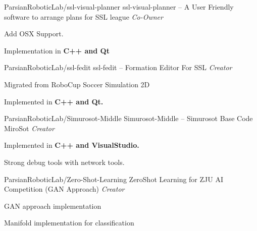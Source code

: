 
\begin{cventries}
  \cventry
    {ParsianRoboticLab/ssl-visual-planner} %
    {ssl-visual-planner -- A User Friendly software to arrange plans for SSL league} %
    {\textit{Co-Owner}} %
    {} %
    {
      \begin{cvitems} %
        \item {Add OSX Support.}
        \item {Implementation in \textbf{C++ and Qt}}
      \end{cvitems}
    }
        \newline

  \cventry
    {ParsianRoboticLab/ssl-fedit} %
    {ssl-fedit -- Formation Editor For SSL} %
    {\textit{Creator}} %
    {} %
    {
      \begin{cvitems} %
        \item {Migrated from RoboCup Soccer Simulation 2D}
        \item {Implemented in \textbf{C++ and Qt.}}
      \end{cvitems}
    }

  \cventry
    {ParsianRoboticLab/Simurosot-Middle} %
    {Simurosot-Middle -- Simurosot Base Code MiroSot} %
    {\textit{Creator}} %
    {} %
    {
      \begin{cvitems} %
        \item {Implemented in \textbf{C++ and VisualStudio.}}
        \item {Strong debug tools with network tools.}
      \end{cvitems}
    }
    
  \cventry
    {ParsianRoboticLab/Zero-Shot-Learning} %
    {ZeroShot Learning for ZJU AI Competition (GAN Approach)} %
    {\textit{Creator}} %
    {} %
    {
      \begin{cvitems} %
        \item {GAN approach implementation}
        \item {Manifold implementation for classification}
      \end{cvitems}
    }



\end{cventries}
